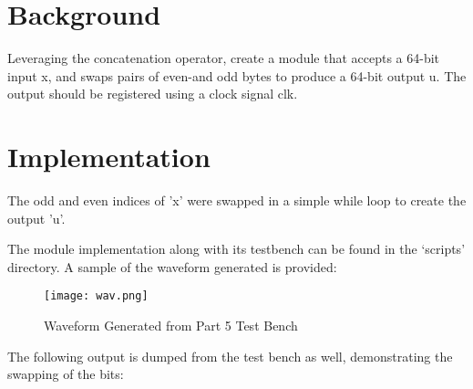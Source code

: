 \documentclass[paper=usletter, fontsize=12pt]{article}
\begin{document}
    \vspace{-0.1in}

    \section{Background}
    Leveraging the concatenation operator, create a module that accepts a 64-bit input x, and swaps pairs of even-and odd bytes to produce a 64-bit output u. The output should be registered using a clock signal clk.

    \section{Implementation}
    The odd and even indices of 'x' were swapped in a simple while loop to create the output 'u'.

    The module implementation along with its testbench can be found in the `scripts' directory. A sample of the waveform generated is provided:

    \begin{figure}[ht]
        \begin{center}
            \texttt{[image: wav.png]}
            \caption{Waveform Generated from Part 5 Test Bench} \label{fig:wav}
        \end{center}
    \end{figure}

    The following output is dumped from the test bench as well, demonstrating the swapping of the bits:
\end{document}
